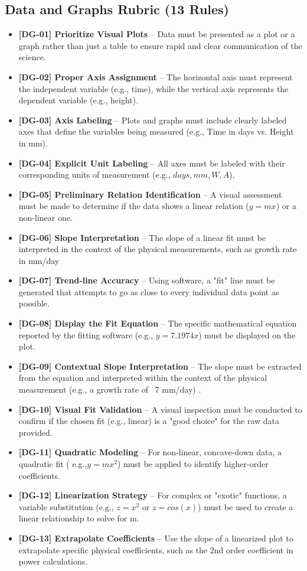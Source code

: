 \documentclass{article}
\begin{document}
\subsection*{Data and Graphs Rubric (13 Rules)}
\begin{itemize}
\item \textbf{ [DG-01] Prioritize Visual Plots } – Data must be presented as a plot or a graph rather than just a table to ensure rapid and clear communication of the science.
\item \textbf{ [DG-02] Proper Axis Assignment } – The horizontal axis must represent the independent variable (e.g., time), while the vertical axis represents the dependent variable (e.g., height).
\item \textbf{ [DG-03] Axis Labeling } – Plots and graphs must include clearly labeled axes that define the variables being measured (e.g., Time in days vs. Height in mm).
\item \textbf{ [DG-04] Explicit Unit Labeling } – All axes must be labeled with their corresponding units of measurement (e.g., $days, mm, W, A$).
\item \textbf{ [DG-05] Preliminary Relation Identification } – A visual assessment must be made to determine if the data shows a linear relation ($y=mx$) or a non-linear one.
\item \textbf{ [DG-06] Slope Interpretation } – The slope of a linear fit must be interpreted in the context of the physical measurements, such as growth rate in mm/day
\item \textbf{ [DG-07] Trend-line Accuracy } – Using software, a "fit" line must be generated that attempts to go as close to every individual data point as possible.
\item \textbf{ [DG-08] Display the Fit Equation } – The specific mathematical equation reported by the fitting software (e.g., $y=7.1974x$) must be displayed on the plot.
\item \textbf{ [DG-09] Contextual Slope Interpretation } – The slope must be extracted from the equation and interpreted within the context of the physical measurement (e.g., a growth rate of ~7 mm/day) .
\item \textbf{ [DG-10] Visual Fit Validation } – A visual inspection must be conducted to confirm if the chosen fit (e.g., linear) is a "good choice" for the raw data provided.
\item \textbf{ [DG-11] Quadratic Modeling } – For non-linear, concave-down data, a quadratic fit ( e.g.,$y=mx^2$) must be applied to identify higher-order coefficients.
\item \textbf{ [DG-12] Linearization Strategy } – For complex or "exotic" functions, a variable substitution (e.g., $z=x^2$ or $z=cos(x)$) must be used to create a linear relationship to solve for m.
\item \textbf{ [DG-13] Extrapolate Coefficients } – Use the slope of a linearized plot to extrapolate specific physical coefficients, such as the 2nd order coefficient in power calculations.
\end{itemize}
\end{document}
